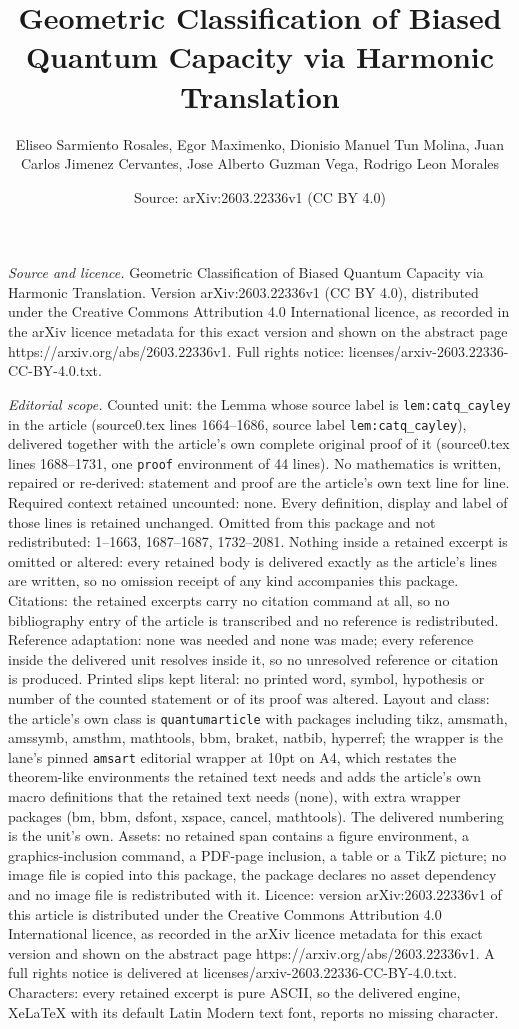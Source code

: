 \documentclass[10pt,a4paper]{amsart}
\title[Geometric Classification of Biased Quantum Capacity via Harm]{Geometric Classification of Biased Quantum Capacity via Harmonic Translation}
\author{Eliseo Sarmiento Rosales, Egor Maximenko, Dionisio Manuel Tun Molina, Juan Carlos Jimenez Cervantes, Jose Alberto Guzman Vega, Rodrigo Leon Morales}
\date{Source: arXiv:2603.22336v1 (CC BY 4.0)}
\begin{document}
\maketitle

\noindent\emph{Source and licence.} Geometric Classification of Biased Quantum Capacity via Harmonic Translation. Version arXiv:2603.22336v1 (CC BY 4.0), distributed under the Creative Commons Attribution 4.0 International licence, as recorded in the arXiv licence metadata for this exact version and shown on the abstract page https://arxiv.org/abs/2603.22336v1. Full rights notice: licenses/arxiv-2603.22336-CC-BY-4.0.txt.\par\smallskip

\noindent\textit{Editorial scope.} Counted unit: the Lemma whose source label is \texttt{lem:catq\_cayley} in the article (source0.tex lines 1664--1686, source label \texttt{lem:catq\_cayley}), delivered together with the article's own complete original proof of it (source0.tex lines 1688--1731, one \texttt{proof} environment of 44 lines). No mathematics is written, repaired or re-derived: statement and proof are the article's own text line for line. Required context retained uncounted: none. Every definition, display and label of those lines is retained unchanged. Omitted from this package and not redistributed: 1--1663, 1687--1687, 1732--2081. Nothing inside a retained excerpt is omitted or altered: every retained body is delivered exactly as the article's lines are written, so no omission receipt of any kind accompanies this package. Citations: the retained excerpts carry no citation command at all, so no bibliography entry of the article is transcribed and no reference is redistributed. Reference adaptation: none was needed and none was made; every reference inside the delivered unit resolves inside it, so no unresolved reference or citation is produced. Printed slips kept literal: no printed word, symbol, hypothesis or number of the counted statement or of its proof was altered. Layout and class: the article's own class is \texttt{quantumarticle} with packages including tikz, amsmath, amssymb, amsthm, mathtools, bbm, braket, natbib, hyperref; the wrapper is the lane's pinned \texttt{amsart} editorial wrapper at 10pt on A4, which restates the theorem-like environments the retained text needs and adds the article's own macro definitions that the retained text needs (none), with extra wrapper packages (bm, bbm, dsfont, xspace, cancel, mathtools). The delivered numbering is the unit's own. Assets: no retained span contains a figure environment, a graphics-inclusion command, a PDF-page inclusion, a table or a TikZ picture; no image file is copied into this package, the package declares no asset dependency and no image file is redistributed with it. Licence: version arXiv:2603.22336v1 of this article is distributed under the Creative Commons Attribution 4.0 International licence, as recorded in the arXiv licence metadata for this exact version and shown on the abstract page https://arxiv.org/abs/2603.22336v1. A full rights notice is delivered at licenses/arxiv-2603.22336-CC-BY-4.0.txt. Characters: every retained excerpt is pure ASCII, so the delivered engine, XeLaTeX with its default Latin Modern text font, reports no missing character.
\end{document}
